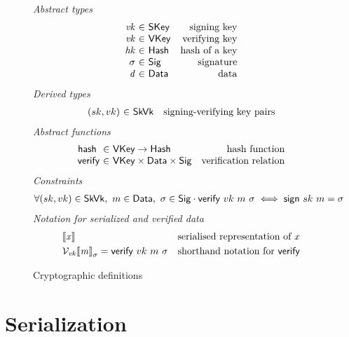 \documentclass[11pt,a4paper]{article}
\newcommand{\VKey}{\type{VKey}}
\newcommand{\SKey}{\type{SKey}}
\newcommand{\Hash}{\type{Hash}}
\newcommand{\SkVk}{\type{SkVk}}
\newcommand{\Sig}{\type{Sig}}
\newcommand{\Data}{\type{Data}}
\newcommand{\verify}[3]{\fun{verify} ~ #1 ~ #2 ~ #3}
\newcommand{\sign}[2]{\fun{sign} ~ #1 ~ #2}
\newcommand{\serialised}[1]{\llbracket \var{#1} \rrbracket}
\newcommand{\hash}[1]{\fun{hash}~ \var{#1}}
\begin{document}
\begin{figure}
  \emph{Abstract types}
  \begin{equation*}
    \begin{array}{r@{~\in~}lr}
      \var{vk} & \SKey & \text{signing key}\\
      \var{vk} & \VKey & \text{verifying key}\\
      \var{hk} & \Hash & \text{hash of a key}\\
      \sigma & \Sig  & \text{signature}\\
      \var{d} & \Data  & \text{data}\\
    \end{array}
  \end{equation*}
  \emph{Derived types}
  \begin{equation*}
    \begin{array}{r@{~\in~}lr}
      (sk, vk) & \SkVk & \text{signing-verifying key pairs}
    \end{array}
  \end{equation*}
  \emph{Abstract functions}
  \begin{equation*}
    \begin{array}{r@{~\in~}lr}
      \hash{} & \VKey \to \Hash
      & \text{hash function} \\
      \fun{verify} & \VKey \times \Data \times \Sig
      & \text{verification relation}\\
    \end{array}
  \end{equation*}
  \emph{Constraints}
  \begin{align*}
    & \forall (sk, vk) \in \SkVk,~ m \in \Data,~ \sigma \in \Sig \cdot
      \verify{vk}{m}{\sigma} \iff \sign{sk}{m} = \sigma
  \end{align*}
  \emph{Notation for serialized and verified data}
  \begin{align*}
    & \serialised{x} & \text{serialised representation of } x\\
    & \mathcal{V}_{\var{vk}}{\serialised{m}}_{\sigma} = \verify{vk}{m}{\sigma}
      & \text{shorthand notation for } \fun{verify}
  \end{align*}
  \caption{Cryptographic definitions}
  \label{fig:crypto-defs}
\end{figure}

\section{Serialization}
\label{sec:serialization}
\end{document}

